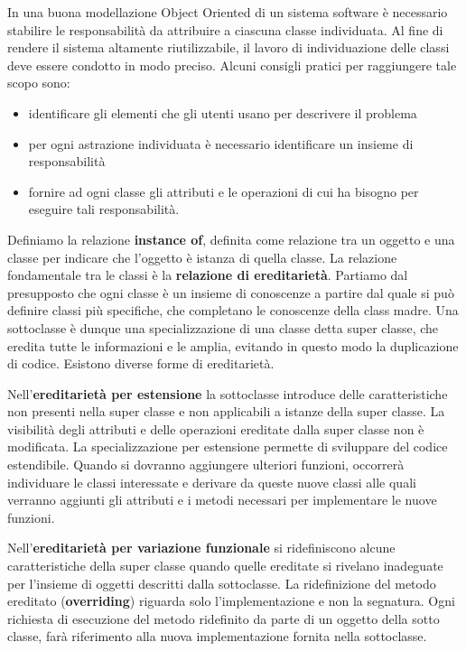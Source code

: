 \documentclass[a4paper,18pt]{extarticle}
\begin{document}
In una buona modellazione Object Oriented di un sistema software è necessario stabilire le responsabilità da attribuire a ciascuna classe individuata. Al fine di rendere il sistema altamente riutilizzabile, il lavoro di individuazione delle classi deve essere condotto in modo preciso. Alcuni consigli pratici per raggiungere tale scopo sono:
\begin{itemize}
    \item identificare gli elementi che gli utenti usano per descrivere il problema
    \item per ogni astrazione individuata è necessario identificare un insieme di responsabilità
    \item fornire ad ogni classe gli attributi e le operazioni di cui ha bisogno per eseguire tali responsabilità.
\end{itemize}

Definiamo la relazione \textbf{instance of}, definita come relazione tra un oggetto e una classe per indicare che l'oggetto è istanza di quella classe. La relazione fondamentale tra le classi è la \textbf{relazione di ereditarietà}. Partiamo dal presupposto che ogni classe è un insieme di conoscenze a partire dal quale si può definire classi più specifiche, che completano le conoscenze della class madre. Una sottoclasse è dunque una specializzazione di una classe detta super classe, che eredita tutte le informazioni e le amplia, evitando in questo modo la duplicazione di codice. Esistono diverse forme di ereditarietà.

Nell'\textbf{ereditarietà per estensione} la sottoclasse introduce delle caratteristiche non presenti nella super classe e non applicabili a istanze della super classe. La visibilità degli attributi e delle operazioni ereditate dalla super classe non è modificata. La specializzazione per estensione permette di sviluppare del codice estendibile. Quando si dovranno aggiungere ulteriori funzioni, occorrerà individuare le classi interessate e derivare da queste nuove classi alle quali verranno aggiunti gli attributi e i metodi necessari per implementare le nuove funzioni.

Nell'\textbf{ereditarietà per variazione funzionale} si ridefiniscono alcune caratteristiche della super classe quando quelle ereditate si rivelano inadeguate per l'insieme di oggetti descritti dalla sottoclasse. La ridefinizione del metodo ereditato (\textbf{overriding}) riguarda solo l'implementazione e non la segnatura. Ogni richiesta di esecuzione del metodo ridefinito da parte di un oggetto della sotto classe, farà riferimento alla nuova implementazione fornita nella sottoclasse.
\end{document}
